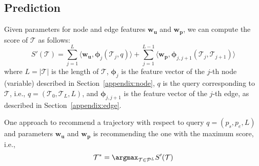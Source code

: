 {\subsection{Prediction}
Given parameters for node and edge features $\mathbf{w_u}$ and $\mathbf{w_p}$, 
we can compute the score of $\mathcal{T}$ as follows:
\begin{displaymath}
S'(\mathcal{T}) = \sum_{j=1}^L     \langle \mathbf{w_u}, \mathbf{\phi}_j (\mathcal{T}_j, q) \rangle +
                  \sum_{j=1}^{L-1} \langle \mathbf{w_p}, \mathbf{\phi}_{j, j+1} (\mathcal{T}_j, \mathcal{T}_{j+1}) \rangle
\end{displaymath}
where $L = |\mathcal{T}|$ is the length of $\mathcal{T}$, 
$\mathbf{\phi}_j$ is the feature vector of the $j$-th node (variable) described in Section~\ref{appendix:node},
$q$ is the query corresponding to $\mathcal{T}$, i.e., $q = (\mathcal{T}_0, \mathcal{T}_L, L)$,
and $\mathbf{\phi}_{j, j+1}$ is the feature vector of the $j$-th edge, as described in Section~\ref{appendix:edge}.

One approach to recommend a trajectory with respect to query $q = (p_s, p_e, L)$ and parameters 
$\mathbf{w_u}$ and $\mathbf{w_p}$ is recommending the one with the maximum score, i.e.,
\begin{displaymath}
    \mathcal{T}^* = \argmax_{\mathcal{T} \in \mathcal{P}^L} S'(\mathcal{T})
\end{displaymath}


}
